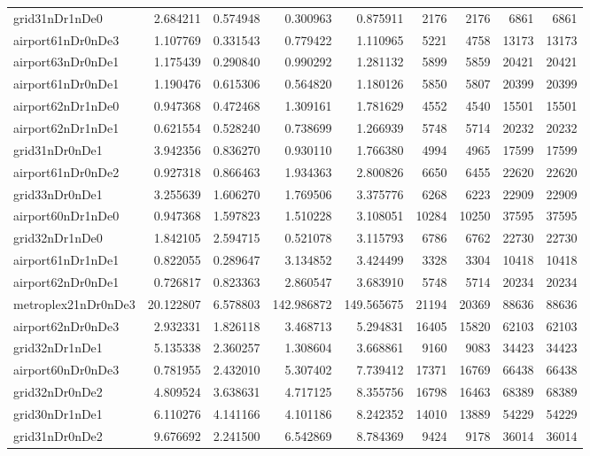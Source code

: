 \begin{longtable}{|l|r|r|r|r|r|r|r|r|}
grid31nDr1nDe0 & 2.684211 & 0.574948 & 0.300963 & 0.875911 & 2176 & 2176 & 6861 & 6861 \\
airport61nDr0nDe3 & 1.107769 & 0.331543 & 0.779422 & 1.110965 & 5221 & 4758 & 13173 & 13173 \\
airport63nDr0nDe1 & 1.175439 & 0.290840 & 0.990292 & 1.281132 & 5899 & 5859 & 20421 & 20421 \\
airport61nDr0nDe1 & 1.190476 & 0.615306 & 0.564820 & 1.180126 & 5850 & 5807 & 20399 & 20399 \\
airport62nDr1nDe0 & 0.947368 & 0.472468 & 1.309161 & 1.781629 & 4552 & 4540 & 15501 & 15501 \\
airport62nDr1nDe1 & 0.621554 & 0.528240 & 0.738699 & 1.266939 & 5748 & 5714 & 20232 & 20232 \\
grid31nDr0nDe1 & 3.942356 & 0.836270 & 0.930110 & 1.766380 & 4994 & 4965 & 17599 & 17599 \\
airport61nDr0nDe2 & 0.927318 & 0.866463 & 1.934363 & 2.800826 & 6650 & 6455 & 22620 & 22620 \\
grid33nDr0nDe1 & 3.255639 & 1.606270 & 1.769506 & 3.375776 & 6268 & 6223 & 22909 & 22909 \\
airport60nDr1nDe0 & 0.947368 & 1.597823 & 1.510228 & 3.108051 & 10284 & 10250 & 37595 & 37595 \\
grid32nDr1nDe0 & 1.842105 & 2.594715 & 0.521078 & 3.115793 & 6786 & 6762 & 22730 & 22730 \\
airport61nDr1nDe1 & 0.822055 & 0.289647 & 3.134852 & 3.424499 & 3328 & 3304 & 10418 & 10418 \\
airport62nDr0nDe1 & 0.726817 & 0.823363 & 2.860547 & 3.683910 & 5748 & 5714 & 20234 & 20234 \\
metroplex21nDr0nDe3 & 20.122807 & 6.578803 & 142.986872 & 149.565675 & 21194 & 20369 & 88636 & 88636 \\
airport62nDr0nDe3 & 2.932331 & 1.826118 & 3.468713 & 5.294831 & 16405 & 15820 & 62103 & 62103 \\
grid32nDr1nDe1 & 5.135338 & 2.360257 & 1.308604 & 3.668861 & 9160 & 9083 & 34423 & 34423 \\
airport60nDr0nDe3 & 0.781955 & 2.432010 & 5.307402 & 7.739412 & 17371 & 16769 & 66438 & 66438 \\
grid32nDr0nDe2 & 4.809524 & 3.638631 & 4.717125 & 8.355756 & 16798 & 16463 & 68389 & 68389 \\
grid30nDr1nDe1 & 6.110276 & 4.141166 & 4.101186 & 8.242352 & 14010 & 13889 & 54229 & 54229 \\
grid31nDr0nDe2 & 9.676692 & 2.241500 & 6.542869 & 8.784369 & 9424 & 9178 & 36014 & 36014 \\

\end{longtable}
